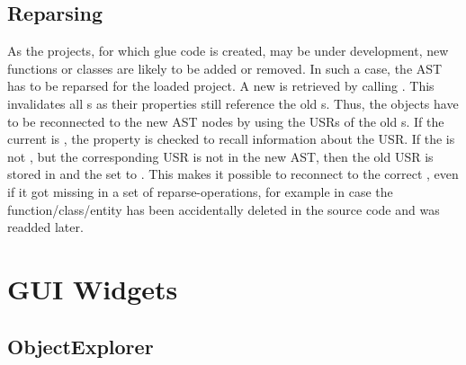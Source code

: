\subsection{Reparsing}

As the  projects, for which glue code is created, may be under development, new functions or classes are likely to be added or removed. In such a case, the  AST has to be reparsed for the loaded project. A new  is retrieved by calling . This invalidates all s as their  properties still reference the old s. Thus, the objects have to be reconnected to the new AST nodes by using the USRs of the old s. If the current  is , the  property is checked to recall information about the USR. If the  is not , but the corresponding USR is not in the new AST, then the old USR is stored in  and the  set to . This makes it possible to reconnect to the correct , even if it got missing in a set of reparse-operations, for example in case the  function/class/entity has been accidentally deleted in the source code and was readded later.

\section{GUI Widgets}

\subsection{ObjectExplorer}
\label{sec:ObjectExplorer}


